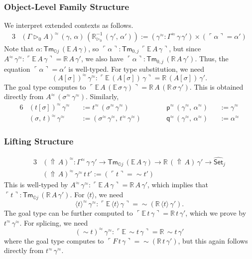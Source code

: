 \documentclass[acmsmall,screen]{acmart}
\newcommand{\msf}[1]{\mathsf{#1}}
\newcommand{\mbb}[1]{\mathbb{#1}}
\newcommand{\wh}[1]{\widehat{#1}}
\newcommand{\ext}{\triangleright}
\newcommand{\Lift}{{\Uparrow}}
\newcommand{\spl}{{\sim}}
\newcommand{\qut}[1]{\langle #1\rangle}
\newcommand{\mbbo}{\mbb{O}}
\newcommand{\Tm}{\msf{Tm}}
\newcommand{\p}{\mathsf{p}}
\newcommand{\q}{\mathsf{q}}
\newcommand{\Set}{\mathsf{Set}}
\newcommand{\emb}[1]{\ulcorner#1\urcorner}
\newcommand{\ev}{\mbb{E}}
\newcommand{\re}{\mbb{R}}
\theoremstyle{remark}
\newcommand{\whset}{\wh{\Set}}
\newcommand{\rextizero}{\re_{\ext_0}^{-1}}
\newcommand{\rel}{^{\approx}}
\begin{document}
\subsubsection{Object-Level Family Structure} We interpret extended contexts as follows.
\begin{alignat*}{3}
  & (\Gamma \ext_0 A)\rel\,(\gamma,\,\alpha)\,(\rextizero\,(\gamma',\,\alpha')) := (\gamma\rel : \Gamma\rel\,\gamma\,\gamma') \times (\emb{\alpha} = \alpha')
\end{alignat*}
Note that $\alpha : \Tm_{\mbbo j}\,(\ev\,A\,\gamma)$, so $\emb{\alpha} :
\Tm_{0,j}\,\emb{\ev\,A\,\gamma}$, but since $A\rel\,\gamma\rel :
\emb{\ev\,A\,\gamma} = \re\,A\,\gamma'$, we also have $\emb{\alpha} :
\Tm_{0,j}\,(\re\,A\,\gamma')$. Thus, the equation $\emb{\alpha} = \alpha'$ is
well-typed. For type substitution, we need
\[
  (A[\sigma])\rel\,\gamma\rel : \emb{\ev\,(A[\sigma])\,\gamma} = \re\,(A[\sigma])\,\gamma'.
\]
The goal type computes to $\emb{\ev\,A\,(\ev\,\sigma\,\gamma)} =
\re\,A\,(\re\,\sigma\,\gamma')$. This is obtained directly from
$A\rel\,(\sigma\rel\,\gamma\rel)$.  Similarly,
\begin{alignat*}{6}
  & (t[\sigma])\rel\,\gamma\rel &&:= t\rel\,(\sigma\rel\,\gamma\rel) && \p\rel\,(\gamma\rel,\,\alpha\rel) &&:= \gamma\rel \\
  & (\sigma,\,t)\rel\,\gamma\rel &&:= (\sigma\rel\,\gamma\rel,\,t\rel\,\gamma\rel)\hspace{2em}&& \q\rel\,(\gamma\rel,\,\alpha\rel) &&:= \alpha\rel
\end{alignat*}

\subsubsection{Lifting Structure}
\begin{alignat*}{3}
  &(\Lift\,A)\rel : \Gamma\rel\,\gamma\,\gamma' \to \Tm_{\mbbo j}\,(\ev\,A\,\gamma) \to \re\,(\Lift\,A)\,\gamma' \to \whset_j\\
  &(\Lift\,A)\rel\,\gamma\rel\,t\,t' := (\emb{t} = \spl t')
\end{alignat*}
This is well-typed by $A\rel\,\gamma\rel : \emb{\ev\,A\,\gamma} = \re\,A\,\gamma'$, which implies
that $\emb{t} : \Tm_{\mbbo j}\,(\re\,A\,\gamma')$. For $\qut{t}$, we need
\[  \qut{t}\rel\,\gamma\rel : \emb{\ev\,\qut{t}\,\gamma} = \spl(\re\,\qut{t}\,\gamma'). \]
The goal type can be further computed to $\emb{\ev\,t\,\gamma} = \re\,t\,\gamma'$, which we prove
by $t\rel\,\gamma\rel$. For splicing, we need
\[
  (\spl t)\rel\,\gamma\rel : \emb{\ev\,\spl t\,\gamma} = \re\,\spl t\,\gamma'
\]
where the goal type computes to $\emb{F\,t\,\gamma} = \spl(\re\,t\,\gamma')$,
but this again follows directly from $t\rel\,\gamma\rel$.
\end{document}
